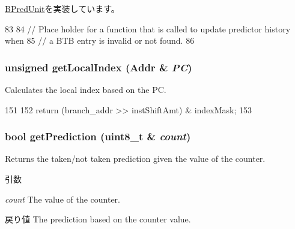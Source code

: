 \hyperlink{classBPredUnit_a7b687ebde63095b00a0b083ba6607cd4}{BPredUnit}を実装しています。


\begin{DoxyCode}
83 {
84 // Place holder for a function that is called to update predictor history when
85 // a BTB entry is invalid or not found.
86 }
\end{DoxyCode}
\hypertarget{classLocalBP_a60ccaea333f32c53f3645a2f7c7e6737}{
\subsubsection[{getLocalIndex}]{\setlength{\rightskip}{0pt plus 5cm}unsigned getLocalIndex ({\bf Addr} \& {\em PC})}}
\label{classLocalBP_a60ccaea333f32c53f3645a2f7c7e6737}
Calculates the local index based on the PC. 


\begin{DoxyCode}
151 {
152     return (branch_addr >> instShiftAmt) & indexMask;
153 }
\end{DoxyCode}
\hypertarget{classLocalBP_ad0f11a4da5ded93ef111f9d8a1d40a54}{
\subsubsection[{getPrediction}]{\setlength{\rightskip}{0pt plus 5cm}bool getPrediction (uint8\_\-t \& {\em count})}}
\label{classLocalBP_ad0f11a4da5ded93ef111f9d8a1d40a54}
Returns the taken/not taken prediction given the value of the counter. 
\begin{DoxyParams}{引数}
\item[{\em count}]The value of the counter. \end{DoxyParams}
\begin{DoxyReturn}{戻り値}
The prediction based on the counter value. 
\end{DoxyReturn}



